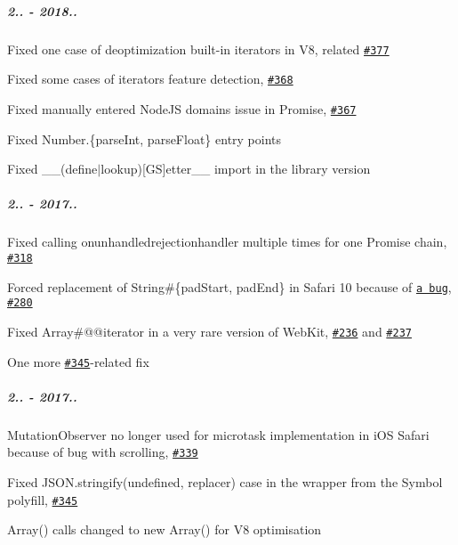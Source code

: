 \subparagraph*{2.. -\/ 2018..}


\begin{DoxyItemize}
\item Fixed one case of deoptimization built-\/in iterators in V8, related \href{https://github.com/zloirock/core-js/issues/377}{\tt \#377}
\item Fixed some cases of iterators feature detection, \href{https://github.com/zloirock/core-js/issues/368}{\tt \#368}
\item Fixed manually entered Node\+JS domains issue in {\ttfamily Promise}, \href{https://github.com/zloirock/core-js/issues/367}{\tt \#367}
\item Fixed {\ttfamily Number.\{parse\+Int, parse\+Float\}} entry points
\item Fixed {\ttfamily \+\_\+\+\_\+(define$\vert$lookup)\mbox{[}GS\mbox{]}etter\+\_\+\+\_\+} import in the {\ttfamily library} version
\end{DoxyItemize}

\subparagraph*{2.. -\/ 2017..}


\begin{DoxyItemize}
\item Fixed calling {\ttfamily onunhandledrejectionhandler} multiple times for one {\ttfamily Promise} chain, \href{https://github.com/zloirock/core-js/issues/318}{\tt \#318}
\item Forced replacement of {\ttfamily String\#\{pad\+Start, pad\+End\}} in Safari 10 because of \href{https://bugs.webkit.org/show_bug.cgi?id=161944}{\tt a bug}, \href{https://github.com/zloirock/core-js/issues/280}{\tt \#280}
\item Fixed {\ttfamily Array\#@@iterator} in a very rare version of {\ttfamily Web\+Kit}, \href{https://github.com/zloirock/core-js/issues/236}{\tt \#236} and \href{https://github.com/zloirock/core-js/issues/237}{\tt \#237}
\item One more \href{https://github.com/zloirock/core-js/issues/345}{\tt \#345}-\/related fix
\end{DoxyItemize}

\subparagraph*{2.. -\/ 2017..}


\begin{DoxyItemize}
\item {\ttfamily Mutation\+Observer} no longer used for microtask implementation in i\+OS Safari because of bug with scrolling, \href{https://github.com/zloirock/core-js/issues/339}{\tt \#339}
\item Fixed {\ttfamily J\+S\+O\+N.\+stringify(undefined, replacer)} case in the wrapper from the {\ttfamily Symbol} polyfill, \href{https://github.com/zloirock/core-js/issues/345}{\tt \#345}
\item {\ttfamily Array()} calls changed to {\ttfamily new Array()} for V8 optimisation
\end{DoxyItemize}

